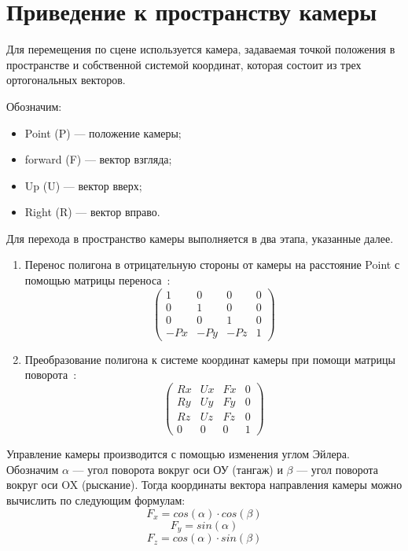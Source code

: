 \newpage

\section{Приведение к пространству камеры}

Для перемещения по сцене используется камера, задаваемая точкой положения в пространстве и собственной системой координат, которая состоит из трех ортогональных векторов.

Обозначим:
\begin{itemize}
	\item Point (P) --- положение камеры;
	\item forward (F) --- вектор взгляда;
	\item Up (U) --- вектор вверх;
	\item Right (R) --- вектор вправо.
\end{itemize}

Для перехода в пространство камеры выполняется в два этапа, указанные далее.
\begin{enumerate}
	\item Перенос полигона в отрицательную стороны от камеры на расстояние Point с помощью матрицы переноса~\cite{palcing-camera}:
	\begin{equation}
		\begin{pmatrix}
			1  & 0  & 0  & 0 \\
			0  & 1  & 0  & 0 \\
			0  & 0  & 1  & 0 \\
			-Px & -Py & -Pz & 1
		\end{pmatrix}
	\end{equation}
	\item Преобразование полигона к системе координат камеры при помощи матрицы поворота~\cite{palcing-camera}:
	\begin{equation}
		\begin{pmatrix}
			Rx  & Ux  & Fx  & 0 \\
			Ry  & Uy  & Fy  & 0 \\
			Rz  & Uz  & Fz  & 0 \\
			0   & 0   & 0   & 1
		\end{pmatrix}
	\end{equation}
\end{enumerate}

Управление камеры производится с помощью изменения углом Эйлера.
Обозначим $\alpha$ --- угол поворота вокруг оси ОУ (тангаж) и  $\beta$ --- угол поворота вокруг оси OX (рыскание).
Тогда координаты вектора направления камеры можно вычислить по следующим формулам:
\begin{equation}
	F_x = cos(\alpha) \cdot cos(\beta)
\end{equation}
\begin{equation}
	F_y = sin(\alpha)
\end{equation}
\begin{equation}
	F_z = cos(\alpha) \cdot sin(\beta)
\end{equation}

